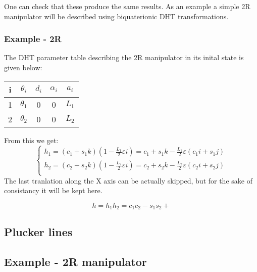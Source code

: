 One can check that these produce the same results. As an example a simple 2R manipulator will be described using biquaterionic DHT transformations.
\subsubsection{Example - 2R}
The DHT parameter table describing the 2R manipulator in its inital state is given below:
\begin{center}
\begin{tabular}{|c|c|c|c|c|}
\hline
i & $\theta_i$ & $d_i$ & $\alpha_i$ & $a_i$\\
\hline
1 & $\theta_1$ & 0 & 0 &  $L_1$ \\
\hline
2 & $\theta_2$ &0 &0 &  $L_2$\\
\hline
\end{tabular}
\end{center}
From this we get:
\begin{equation}
    \begin{cases}
        h_1 = (c_1+s_1k)(1-\frac{L_1}{2}\varepsilon i) = c_1+s_1k - \frac{L_1}{2}\varepsilon( c_1i+s_1j )\\
        h_2 = (c_2+s_2k)(1-\frac{L_2}{2}\varepsilon i) = c_2+s_2k - \frac{L_2}{2}\varepsilon( c_2i+s_2j )\\
    \end{cases}
\end{equation}
The last tranlation along the X axis can be actually skipped, but for the sake of consistancy it will be kept here.

\begin{equation}
    h = h_1h_2 = c_1c_2-s_1s_2 +
\end{equation}

\subsection{Plucker lines}

\subsection{Example - 2R manipulator}

